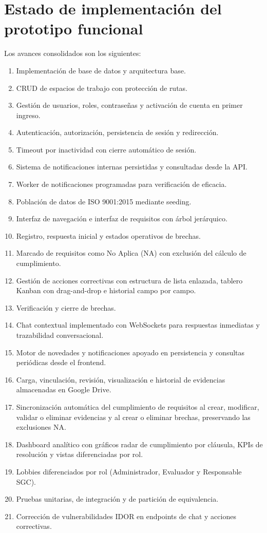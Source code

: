 \documentclass[final]{udpthesis}
\begin{document}
\chapter{Estado de implementación del prototipo funcional}

Los avances consolidados son los siguientes:

\begin{enumerate}
    \item Implementación de base de datos y arquitectura base.
    \item CRUD de espacios de trabajo con protección de rutas.
    \item Gestión de usuarios, roles, contraseñas y activación de cuenta en primer ingreso.
    \item Autenticación, autorización, persistencia de sesión y redirección.
    \item Timeout por inactividad con cierre automático de sesión.
    \item Sistema de notificaciones internas persistidas y consultadas desde la API.
    \item Worker de notificaciones programadas para verificación de eficacia.
    \item Población de datos de ISO 9001:2015 mediante seeding.
    \item Interfaz de navegación e interfaz de requisitos con árbol jerárquico.
    \item Registro, respuesta inicial y estados operativos de brechas.
    \item Marcado de requisitos como No Aplica (NA) con exclusión del cálculo de cumplimiento.
    \item Gestión de acciones correctivas con estructura de lista enlazada, tablero Kanban con drag-and-drop e historial campo por campo.
    \item Verificación y cierre de brechas.
    \item Chat contextual implementado con WebSockets para respuestas inmediatas y trazabilidad conversacional.
    \item Motor de novedades y notificaciones apoyado en persistencia y consultas periódicas desde el frontend.
    \item Carga, vinculación, revisión, visualización e historial de evidencias almacenadas en Google Drive.
    \item Sincronización automática del cumplimiento de requisitos al crear, modificar, validar o eliminar evidencias y al crear o eliminar brechas, preservando las exclusiones NA.
    \item Dashboard analítico con gráficos radar de cumplimiento por cláusula, KPIs de resolución y vistas diferenciadas por rol.
    \item Lobbies diferenciados por rol (Administrador, Evaluador y Responsable SGC).
    \item Pruebas unitarias, de integración y de partición de equivalencia.
    \item Corrección de vulnerabilidades IDOR en endpoints de chat y acciones correctivas.
\end{enumerate}
\end{document}
